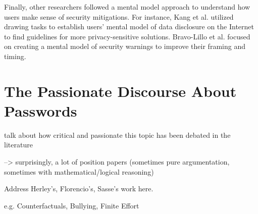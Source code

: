 	Finally, other researchers followed a mental model approach to understand how users make sense of security mitigations. For instance, Kang et al. utilized drawing tasks to establish users' mental model of data disclosure on the Internet \cite{Kang2015MentalModelsDrawing} to find guidelines for more privacy-sensitive solutions. Bravo-Lillo et al. focused on creating a mental model of security warnings \cite{BravoLillo2011WarningsMentalModel} to improve their framing and timing.
	
	
\section{The Passionate Discourse About Passwords}\label{sec:rw:passionate_discourse}
talk about how critical and passionate this topic has been debated in the literature

--> surprisingly, a lot of position papers (sometimes pure argumentation, sometimes with mathematical/logical reasoning) 

Address Herley's, Florencio's, Sasse's work here. 

e.g. Counterfactuals, Bullying, Finite Effort 
